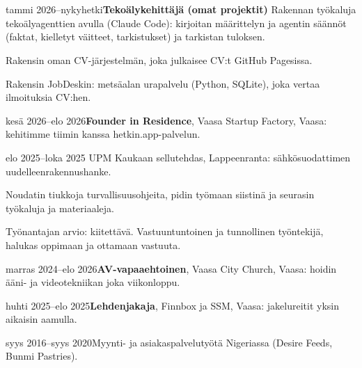 \documentclass[a4paper,11pt]{article}
\begin{document}
\section{}

\section{}
\begin{cventry}{tammi 2026--nykyhetki}{\textbf{Tekoälykehittäjä (omat projektit)}}
  Rakennan työkaluja tekoälyagenttien avulla (Claude Code): kirjoitan määrittelyn ja agentin säännöt (faktat, kielletyt väitteet, tarkistukset) ja tarkistan tuloksen.\par
  Rakensin oman CV-järjestelmän, joka julkaisee CV:t GitHub Pagesissa.\par
  Rakensin JobDeskin: metsäalan urapalvelu (Python, SQLite), joka vertaa ilmoituksia CV:hen.
\end{cventry}
\begin{cventry}{kesä 2026--elo 2026}{\textbf{Founder in Residence}, Vaasa Startup Factory, Vaasa: kehitimme tiimin kanssa hetkin.app-palvelun.}
\end{cventry}
\begin{cventry}{elo 2025--loka 2025}{}
  UPM Kaukaan sellutehdas, Lappeenranta: sähkösuodattimen uudelleenrakennushanke.\par
  Noudatin tiukkoja turvallisuusohjeita, pidin työmaan siistinä ja seurasin työkaluja ja materiaaleja.\par
  Työnantajan arvio: kiitettävä. Vastuuntuntoinen ja tunnollinen työntekijä, halukas oppimaan ja ottamaan vastuuta.
\end{cventry}
\begin{cventry}{marras 2024--elo 2026}{\textbf{AV-vapaaehtoinen}, Vaasa City Church, Vaasa: hoidin ääni- ja videotekniikan joka viikonloppu.}
\end{cventry}
\begin{cventry}{huhti 2025--elo 2025}{\textbf{Lehdenjakaja}, Finnbox ja SSM, Vaasa: jakelureitit yksin aikaisin aamulla.}
\end{cventry}
\begin{cventry}{syys 2016--syys 2020}{Myynti- ja asiakaspalvelutyötä Nigeriassa (Desire Feeds, Bunmi Pastries).}
\end{cventry}

\section{}
\end{document}
